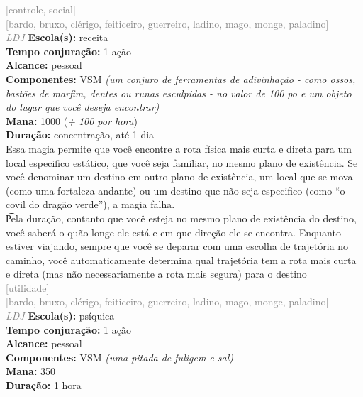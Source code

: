 \documentclass{RPG_Adventure}[2021/10/20]
\begin{document}
{\scriptsize \textcolor{gray}{[controle, social]\\}}
{\scriptsize \textcolor{gray}{[bardo, bruxo, clérigo, feiticeiro, guerreiro, ladino, mago, monge, paladino]\\}}
{\tiny \textcolor{gray}{\textit{LDJ}}}
{\small \t \textbf{Escola(s):} receita\\\t \textbf{Tempo conjuração:} 1 ação\\\t \textbf{Alcance:} pessoal\\\t \textbf{Componentes:} VSM \textit{(um conjuro de ferramentas de adivinhação - como ossos, bastões de marfim, dentes ou runas esculpidas - no valor de 100 po e um objeto do lugar que você deseja encontrar)}\\\t \textbf{Mana:} 1000 (\textit{+ 100 por hora})\\\t \textbf{Duração:} concentração, até 1 dia\\}
{\normalsize Essa magia permite que você encontre a rota física mais curta e direta para um local especifico estático, que você seja familiar, no mesmo plano de existência. Se você denominar um destino em outro plano de existência, um local que se mova (como uma fortaleza andante) ou um destino que não seja especifico (como “o covil do dragão verde”), a magia falha.\\\t Pela duração, contanto que você esteja no mesmo plano de existência do destino, você saberá o quão longe ele está e em que direção ele se encontra. Enquanto estiver viajando, sempre que você se deparar com uma escolha de trajetória no caminho, você automaticamente determina qual trajetória tem a rota mais curta e direta (mas não necessariamente a rota mais segura) para o destino\\}
{\scriptsize \textcolor{gray}{[utilidade]\\}}
{\scriptsize \textcolor{gray}{[bardo, bruxo, clérigo, feiticeiro, guerreiro, ladino, mago, monge, paladino]\\}}
{\tiny \textcolor{gray}{\textit{LDJ}}}
{\small \t \textbf{Escola(s):} psíquica\\\t \textbf{Tempo conjuração:} 1 ação\\\t \textbf{Alcance:} pessoal\\\t \textbf{Componentes:} VSM \textit{(uma pitada de fuligem e sal)}\\\t \textbf{Mana:} 350\\\t \textbf{Duração:} 1 hora\\}
\end{document}

